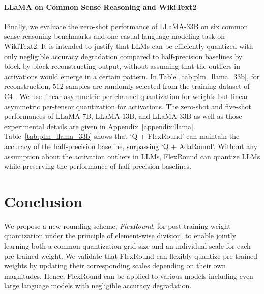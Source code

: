 \documentclass{article}
\theoremstyle{plain}
\theoremstyle{definition}
\theoremstyle{remark}
\begin{document}
\paragraph{LLaMA on Common Sense Reasoning and WikiText2} 
Finally, we evaluate the zero-shot performance of LLaMA-$33$B on six common sense reasoning benchmarks and one casual language modeling task on WikiText2. It is intended to justify that LLMs can be efficiently quantized with only negligible accuracy degradation compared to half-precision baselines by block-by-block reconstructing output, without assuming that the outliers in activations would emerge in a certain pattern. In Table~\ref{tab:plm_llama_33b}, for reconstruction, $512$ samples are randomly selected from the training dataset of C4 \citep{raffel2020c4}. We use linear asymmetric per-channel quantization for weights but linear asymmetric per-tensor quantization for activations. The zero-shot and five-shot performances of LLaMA-$7$B, LLaMA-$13$B, and LLaMA-$33$B as well as those experimental details are given in Appendix~\ref{appendix:llama}. Table~\ref{tab:plm_llama_33b} shows that `Q + FlexRound' can maintain the accuracy of the half-precision baseline, surpassing `Q + AdaRound'. Without any assumption about the activation outliers in LLMs, FlexRound can quantize LLMs while preserving the performance of half-precision baselines.

\section{Conclusion}\label{sec:conclusion}
We propose a new rounding scheme, \emph{FlexRound}, for post-training weight quantization under the principle of element-wise division, to enable jointly learning both a common quantization grid size and an individual scale for each pre-trained weight. We validate that FlexRound can flexibly quantize pre-trained weights by updating their corresponding scales depending on their own magnitudes.
Hence, FlexRound can be applied to various models including even large language models with negligible accuracy degradation.
\end{document}

